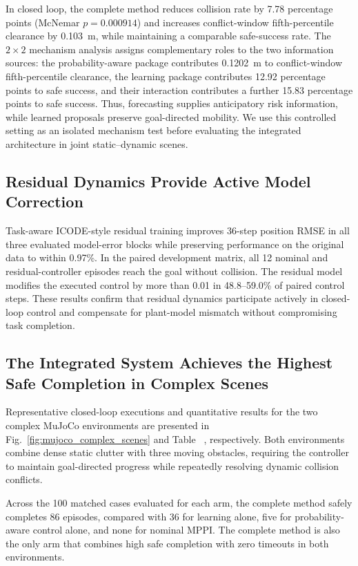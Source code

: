 \documentclass[conference]{IEEEtran}
\newcommand{\reviewbox}[2]{%
    \begingroup
    \setlength{\fboxsep}{0.35pt}%
    \setlength{\fboxrule}{0.45pt}%
    \hyperref[#1]{\fcolorbox{red}{white}{\vphantom{I}#2}}%
    \endgroup}
\newcommand{\reviewref}[1]{\reviewbox{#1}{\ref*{#1}}}
\newcommand{\reviewref}[1]{\ref{#1}}
\begin{document}
In closed loop, the complete method reduces collision rate by 7.78 percentage
points (McNemar $p=0.000914$) and increases conflict-window
fifth-percentile clearance by 0.103~m, while maintaining a comparable
safe-success rate. The $2\times2$ mechanism analysis assigns complementary
roles to the two information sources: the probability-aware package
contributes 0.1202~m to conflict-window fifth-percentile clearance, the
learning package contributes 12.92 percentage points to safe success, and
their interaction contributes a further 15.83 percentage points to safe
success. Thus, forecasting supplies anticipatory risk information, while
learned proposals preserve goal-directed mobility. We use this controlled
setting as an isolated mechanism test before evaluating the integrated
architecture in joint static--dynamic scenes.

\subsection{Residual Dynamics Provide Active Model Correction}

Task-aware ICODE-style residual training improves 36-step position RMSE in
all three evaluated model-error blocks while preserving performance on the
original data to within 0.97\%. In the paired development matrix, all
12 nominal and residual-controller episodes reach the goal without collision.
The residual model modifies the executed control by more than 0.01 in
48.8--59.0\% of paired control steps. These results confirm that residual
dynamics participate actively in closed-loop control and compensate for
plant-model mismatch without compromising task completion.

\subsection{The Integrated System Achieves the Highest Safe Completion in Complex Scenes}
\label{subsec:complex_results}

Representative closed-loop executions and quantitative results for the two
complex MuJoCo environments are presented in
Fig.~\ref{fig:mujoco_complex_scenes} and
Table~\reviewref{tab:complex}, respectively. Both environments combine dense
static clutter with three moving obstacles, requiring the controller to
maintain goal-directed progress while repeatedly resolving dynamic collision
conflicts.



Across the 100 matched cases evaluated for each arm, the complete method
safely completes 86 episodes, compared with 36 for learning alone, five for
probability-aware control alone, and none for nominal MPPI. The complete
method is also the only arm that combines high safe completion with zero
timeouts in both environments.
\end{document}
